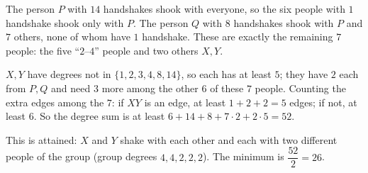 The person $P$ with $14$ handshakes shook with everyone, so the six people with $1$ handshake shook only with $P$. The person $Q$ with $8$ handshakes shook with $P$ and $7$ others, none of whom have $1$ handshake. These are exactly the remaining $7$ people: the five ``$2$--$4$'' people and two others $X,Y$.

$X,Y$ have degrees not in $\{1,2,3,4,8,14\}$, so each has at least $5$; they have $2$ each from $P,Q$ and need $3$ more among the other $6$ of these $7$ people. Counting the extra edges among the $7$: if $XY$ is an edge, at least $1+2+2=5$ edges; if not, at least $6$. So the degree sum is at least $6+14+8+7\cdot2+2\cdot5=52$.

This is attained: $X$ and $Y$ shake with each other and each with two different people of the group (group degrees $4,4,2,2,2$). The minimum is $\dfrac{52}2=\boxed{26}$.
